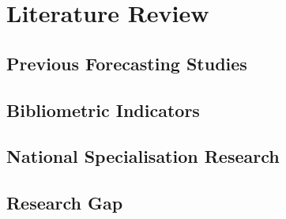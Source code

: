 \chapter{Literature Review} \label{chap:lit}

\section{Previous Forecasting Studies}

\section{Bibliometric Indicators}

\section{National Specialisation Research}

\section{Research Gap}
